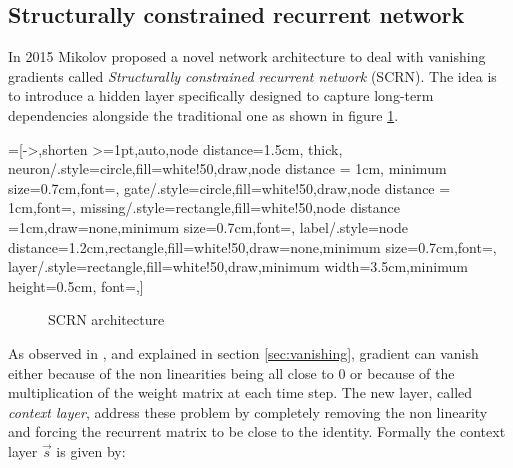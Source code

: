 \subsection{Structurally constrained recurrent network}

In 2015 Mikolov proposed a novel network architecture to deal with vanishing gradients \cite{scrn} called 
\textit{Structurally constrained recurrent network} (SCRN). The idea is to introduce a hidden layer specifically 
designed to capture long-term dependencies alongside the traditional one as shown in figure \ref{fig:scrn}.


=[->,shorten >=1pt,auto,node distance=1.5cm,
  thick,
  neuron/.style={circle,fill=white!50,draw,node distance = 1cm, minimum size=0.7cm,font=\sffamily\Large\bfseries},
  gate/.style={circle,fill=white!50,draw,node distance = 1cm,font=\sffamily\small\bfseries},
  missing/.style={rectangle,fill=white!50,node distance =1cm,draw=none,minimum size=0.7cm,font=\sffamily\Huge\bfseries},
  label/.style={node distance=1.2cm,rectangle,fill=white!50,draw=none,minimum size=0.7cm,font=\sffamily\normalsize},
  layer/.style={rectangle,fill=white!50,draw,minimum width=3.5cm,minimum height=0.5cm, font=\sffamily\normalsize},]
\begin{figure}[!h]
 \centering
{}
\caption{SCRN architecture}
\label{fig:scrn}
\end{figure}


As observed in \cite{scrn}, and explained in section \ref{sec:vanishing}, gradient can vanish either because of the 
non linearities being all close to 0 or because of the multiplication of the weight matrix at each time step. The new 
layer, called \textit{context layer}, address these problem by completely removing the non linearity and forcing the 
recurrent matrix to be close to the identity. Formally the context layer  $\vec{s}$ is given by:

